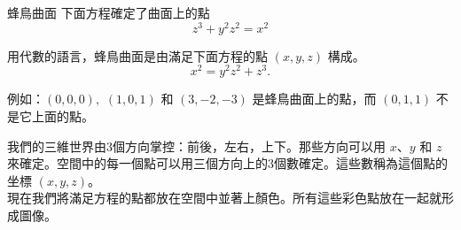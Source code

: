 \begin{surferPage}{蜂鳥曲面}
下面方程確定了曲面上的點\\

  \smallskip
\[z^3+ y^2	z^2	= x^2\]

\singlespacing
用代數的語言，蜂鳥曲面是由滿足下面方程的點 $(x, y, z)$ 構成。
\smallskip
\[ x^2= y^2z^2+z^3.\]

\smallskip
例如：$(0,0,0),$ $(1,0,1)$ 和 $(3,-2,-3)$ 是蜂鳥曲面上的點，而 $(0,1,1)$ 不是它上面的點。\\

\singlespacing

我們的三維世界由3個方向掌控：前後，左右，上下。那些方向可以用 $x$、$y$ 和 $z$來確定。空間中的每一個點可以用三個方向上的3個數確定。這些數稱為這個點的坐標 $(x,y,z)$。\\

\singlespacing
現在我們將滿足方程的點都放在空間中並著上顏色。所有這些彩色點放在一起就形成圖像。
\end{surferPage}

